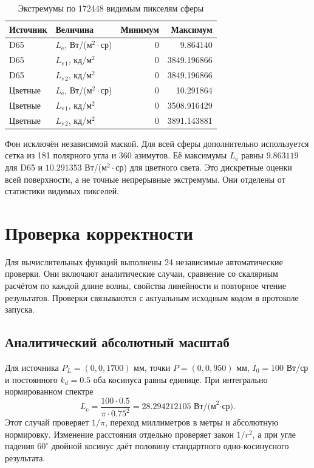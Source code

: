 \documentclass[a4paper,12pt]{article}
\newcommand{\Le}{L_{\mathrm e}}
\newcommand{\Lv}{L_{\mathrm v}}
\newcommand{\TestsCount}{24}
\begin{document}
\begin{table}[H]\centering\small
\caption{Экстремумы по 172448 видимым пикселям сферы}
\begin{tabular}{@{}llrr@{}}\toprule
Источник & Величина & Минимум & Максимум\\\midrule
D65 & $\Le$, Вт/(м$^2\cdot$ср) & 0 & 9.864140\\
D65 & $\Lv{}_1$, кд/м$^2$ & 0 & 3849.196866\\
D65 & $\Lv{}_2$, кд/м$^2$ & 0 & 3849.196866\\
Цветные & $\Le$, Вт/(м$^2\cdot$ср) & 0 & 10.291864\\
Цветные & $\Lv{}_1$, кд/м$^2$ & 0 & 3508.916429\\
Цветные & $\Lv{}_2$, кд/м$^2$ & 0 & 3891.143881\\\bottomrule
\end{tabular}
\end{table}

Фон исключён независимой маской. Для всей сферы дополнительно используется сетка из 181 полярного угла и 360 азимутов. Её максимумы $\Le$ равны $9.863119$ для D65 и $10.291353$ Вт/(м$^2\cdot$ср) для цветного света. Это дискретные оценки всей поверхности, а не точные непрерывные экстремумы. Они отделены от статистики видимых пикселей.

\clearpage
\section{Проверка корректности}

Для вычислительных функций выполнены \TestsCount{} независимые автоматические проверки. Они включают аналитические случаи, сравнение со скалярным расчётом по каждой длине волны, свойства линейности и повторное чтение результатов. Проверки связываются с актуальным исходным кодом в протоколе запуска.

\subsection{Аналитический абсолютный масштаб}
Для источника $P_L=(0,0,1700)$ мм, точки $P=(0,0,950)$ мм, $I_0=100$ Вт/ср и постоянного $k_d=0.5$ оба косинуса равны единице. При интегрально нормированном спектре
\[
 \Le=\frac{100\cdot0.5}{\pi\cdot0.75^2}
 =28.294212105\text{ Вт/(м}^2\text{·ср)}.
\]
Этот случай проверяет $1/\pi$, переход миллиметров в метры и абсолютную нормировку. Изменение расстояния отдельно проверяет закон $1/r^2$, а при угле падения $60^\circ$ двойной косинус даёт половину стандартного одно-косинусного результата.
\end{document}
